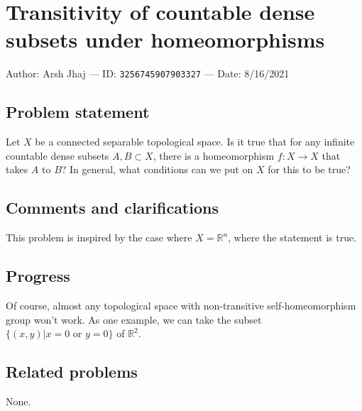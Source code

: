 
\section{Transitivity of countable dense subsets under homeomorphisms}

Author: Arsh Jhaj --- ID: \verb`3256745907903327` --- Date: 8/16/2021

\subsection{Problem statement}

Let $X$ be a connected separable topological space. Is it true that for any infinite countable dense subsets $A,B\subset X$, there is a homeomorphism $f:X\to X$ that takes $A$ to $B$? In general, what conditions can we put on $X$ for this to be true?

\subsection{Comments and clarifications}

This problem is inspired by the case where $X=\mathbb{R}^n$, where the statement is true.

\subsection{Progress}

Of course, almost any topological space with non-transitive self-homeomorphism group won't work. As one example, we can take the subset $\{(x,y)\vert x=0\textrm{ or }y=0\}$ of $\mathbb{R}^2$.

\subsection{Related problems}

None.

